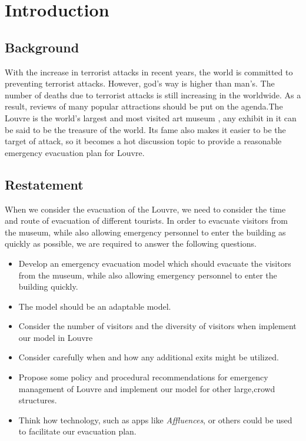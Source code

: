 \section{Introduction}

\subsection{Background}
With the increase in terrorist attacks in recent years, the world is committed to preventing terrorist attacks. However, god's way is higher than man's. The number of deaths due to terrorist attacks is still increasing in the worldwide. As a result, reviews of many popular attractions should be put on the agenda.The Louvre is the world's largest and most visited art museum , any exhibit in it can be said to be the treasure of the world. Its fame also makes it easier to be the target of attack, so it becomes a hot discussion topic to provide a reasonable emergency evacuation plan for Louvre.
 
\subsection{Restatement}
When we consider the evacuation of the Louvre, we need to consider the time and route of evacuation of different tourists. In order to evacuate visitors from the museum, while also allowing emergency personnel to enter the building as quickly as possible, we are required to answer the following questions.
\begin{itemize}
    \item Develop an emergency evacuation model which should evacuate the visitors from the museum, while also allowing emergency personnel to enter the building quickly.
    \item The model should be an adaptable model.
    \item Consider the number of visitors and the diversity  of visitors when implement our model in Louvre
    \item Consider carefully when and how any additional exits might be utilized.
    \item Propose some policy and procedural recommendations for emergency management of Louvre and implement our model for other large,crowd structures.
    \item Think how technology, such as apps like \emph{Affluences}, or others could be used to facilitate our evacuation plan.
    
\end{itemize}


